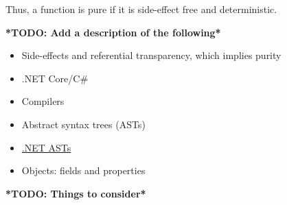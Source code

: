 \documentclass[a4paper,12pt]{article}
\begin{document}

Thus, a function is pure if it is side-effect free and deterministic.

\noindent\makebox[\linewidth]{\rule{\textwidth}{0.4pt}} %

\textbf{*TODO: Add a description of the following*}
\begin{itemize}
  \item Side-effects and referential transparency, which implies purity~\cite{purity-in-javascript}
  \item .NET Core/C\#
  \item Compilers
  \item Abstract syntax trees (ASTs)
  \item \href{https://docs.microsoft.com/en-us/dotnet/csharp/roslyn-sdk/work-with-syntax}{.NET ASTs}~\cite{albahari2003nutshell}
  \item Objects: fields and properties %
\end{itemize}


\textbf{*TODO: Things to consider*}
\end{document}

